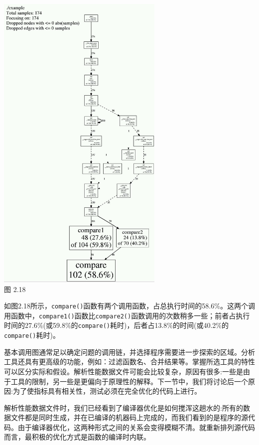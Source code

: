 \begin{center}
\includegraphics[width=0.6\textwidth]{content/1/chapter2/images/18.jpg}\\
图 2.18
\end{center}

如图2.18所示，\texttt{compare()}函数有两个调用函数，占总执行时间的58.6\%。这两个调用函数中，\texttt{compare1()}函数比\texttt{compare2()}函数调用的次数稍多一些；前者占执行时间的27.6\%(或59.8\%的\texttt{compare()}耗时)，后者占13.8\%的时间(或40.2\%的\texttt{compare()}耗时)。

基本调用图通常足以确定问题的调用链，并选择程序需要进一步探索的区域。分析工具还具有更高级的功能，例如：过滤函数名、合并结果等。掌握所选工具的特性可以区分实际和假设。解析性能数据文件可能会比较复杂，原因有很多:一些是由于工具的限制，另一些是更偏向于原理性的解释。下一节中，我们将讨论后一个原因:为了使指标具有相关性，测试必须在完全优化的代码上进行。


解析性能数据文件时，我们已经看到了编译器优化是如何搅浑这趟水的:所有的数据文件都是同时生成，并在已编译的机器码上完成的，而我们看到的是程序的源代码。由于编译器优化，这两种形式之间的关系会变得模糊不清。就重新排列源代码而言，最积极的优化方式是函数的编译时内联。

